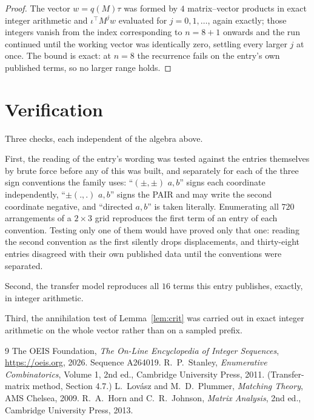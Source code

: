 \documentclass[11pt,a4paper]{article}
\theoremstyle{plain}
\theoremstyle{definition}
\begin{document}
\begin{proof}
The vector $w=q(M)\tau$ was formed by $4$ matrix--vector products in exact integer
arithmetic and $\iota^{\!\top}M^{j}w$ evaluated for $j=0,1,\dots$, again exactly; those
integers vanish from the index corresponding to $n=8+1$ onwards and the run continued
until the working vector was identically zero, settling every larger $j$ at once. The bound is exact: at $n=8$ the recurrence fails on the entry's own published terms, so no larger range holds.
\end{proof}

\section{Verification}

Three checks, each independent of the algebra above.

First, the reading of the entry's wording was tested against the entries themselves by brute
force before any of this was built, and separately for each of the three sign conventions the
family uses: ``$(\pm,\pm)$ $a,b$'' signs each coordinate independently, ``$\pm(.,.)$ $a,b$''
signs the PAIR and may write the second coordinate negative, and ``directed $a,b$'' is taken
literally. Enumerating all $720$ arrangements of a $2\times3$ grid reproduces the first term
of an entry of each convention. Testing only one of them would have proved only that one:
reading the second convention as the first silently drops displacements, and thirty-eight
entries disagreed with their own published data until the conventions were separated.

Second, the transfer model reproduces all $16$ terms this entry publishes, exactly, in
integer arithmetic.

Third, the annihilation test of Lemma~\ref{lem:crit} was carried out in exact integer
arithmetic on the whole vector rather than on a sampled prefix.

\begin{thebibliography}{9}
 The OEIS Foundation, \emph{The On-Line Encyclopedia of Integer
Sequences}, \url{https://oeis.org}, 2026. Sequence A264019.
 R.~P.~Stanley, \emph{Enumerative Combinatorics}, Volume 1, 2nd ed.,
Cambridge University Press, 2011. (Transfer-matrix method, Section 4.7.)
 L.~Lov\'asz and M.~D.~Plummer, \emph{Matching Theory}, AMS Chelsea, 2009.
 R.~A.~Horn and C.~R.~Johnson, \emph{Matrix Analysis}, 2nd ed., Cambridge
University Press, 2013.
\end{thebibliography}
\end{document}
